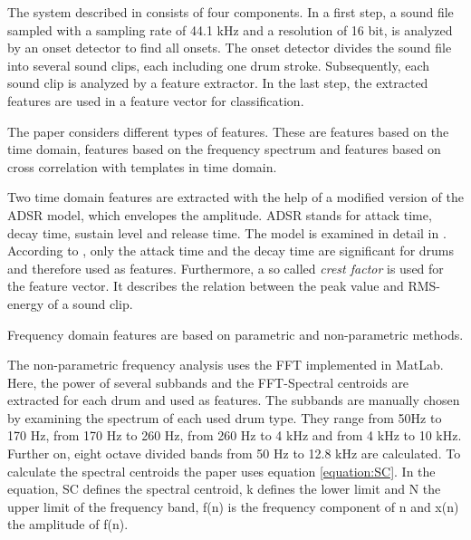 The system described in \autocite{Christophersen:2007} consists of four components. In a first step, a sound file sampled with a sampling rate of 44.1 kHz and a resolution of 16 bit, is analyzed by an onset detector to find all onsets. The onset detector divides the sound file into several sound clips, each including one drum stroke. Subsequently, each sound clip is analyzed by a feature extractor. In the last step, the extracted features are used in a feature vector for classification.


The paper considers different types of features. These are features based on the time domain, features based on the frequency spectrum and features based on cross correlation with templates in time domain.

Two time domain features are extracted with the help of a modified version of the ADSR model, which envelopes the amplitude. ADSR stands for attack time, decay time, sustain level and release time. The model is examined in detail in \autocite{Campbell:2001}. According to \autocite{Christophersen:2007}, only the attack time and the decay time are significant for drums and therefore used as features. Furthermore, a so called \textit{crest factor} is used for the feature vector. It describes the relation between the peak value and RMS-energy of a sound clip.

Frequency domain features are based on parametric and non-parametric methods. 

The non-parametric frequency analysis uses the FFT implemented in MatLab\textsuperscript{\textregistered}. Here, the power of several subbands and the FFT-Spectral centroids are extracted for each drum and used as features. The subbands are manually chosen by examining the spectrum of each used drum type. They range from 50Hz to 170 Hz, from 170 Hz to 260 Hz, from 260 Hz to 4 kHz and from 4 kHz to 10 kHz. Further on, eight octave divided bands from 50 Hz to 12.8 kHz are calculated. To calculate the spectral centroids the paper uses equation \ref{equation:SC}. In the equation, SC defines the spectral centroid, k defines the lower limit and N the upper limit of the frequency band, f(n) is the frequency component of n and x(n) the amplitude of f(n).

